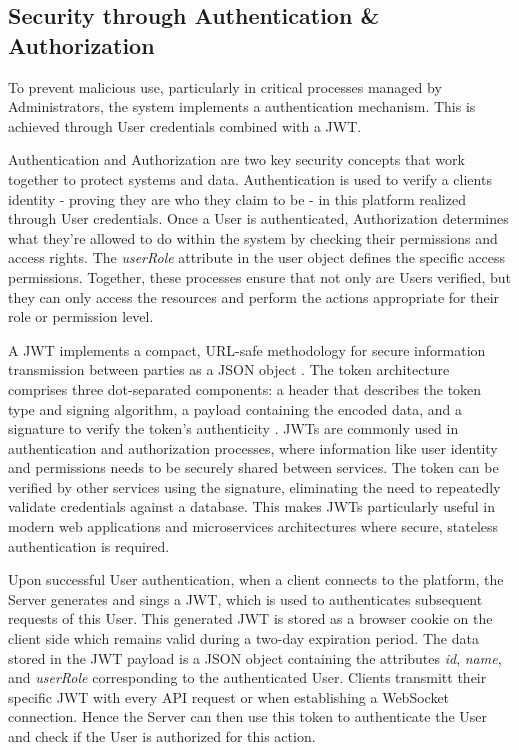 \subsection{Security through Authentication \& Authorization}
\label{subsec:implementation:authentication}
To prevent malicious use, particularly in critical processes managed by Administrators, the system implements a authentication mechanism. This is achieved through User credentials combined with a \ac{JWT}.

Authentication and Authorization are two key security concepts that work together to protect systems and data. Authentication is used to verify a clients identity - proving they are who they claim to be - in this platform realized through User credentials. Once a User is authenticated, Authorization determines what they're allowed to do within the system by checking their permissions and access rights. The \emph{userRole} attribute in the user object defines the specific access permissions. Together, these processes ensure that not only are Users verified, but they can only access the resources and perform the actions appropriate for their role or permission level.

A \ac{JWT} implements a compact, URL-safe methodology for secure information transmission between parties as a \acs{JSON} object \cite{implementation:jwt}. The token architecture comprises three dot-separated components: a header that describes the token type and signing algorithm, a payload containing the encoded data, and a signature to verify the token's authenticity \cite{implementation:jwt}. \ac{JWT}s are commonly used in authentication and authorization processes, where information like user identity and permissions needs to be securely shared between services. The token can be verified by other services using the signature, eliminating the need to repeatedly validate credentials against a database. This makes \ac{JWT}s particularly useful in modern web applications and microservices architectures where secure, stateless authentication is required. \cite{implementation:jwt}

Upon successful User authentication, when a client connects to the platform, the Server generates and sings a \ac{JWT}, which is used to authenticates subsequent requests of this User. This generated \ac{JWT} is stored as a browser cookie on the client side which remains valid during a two-day expiration period. The data stored in the \ac{JWT} payload is a \acs{JSON} object containing the attributes \emph{id}, \emph{name}, and \emph{userRole} corresponding to the authenticated User. Clients transmitt their specific \ac{JWT} with every \ac{API} request or when establishing a WebSocket connection. Hence the Server can then use this token to authenticate the User and check if the User is authorized for this action.

